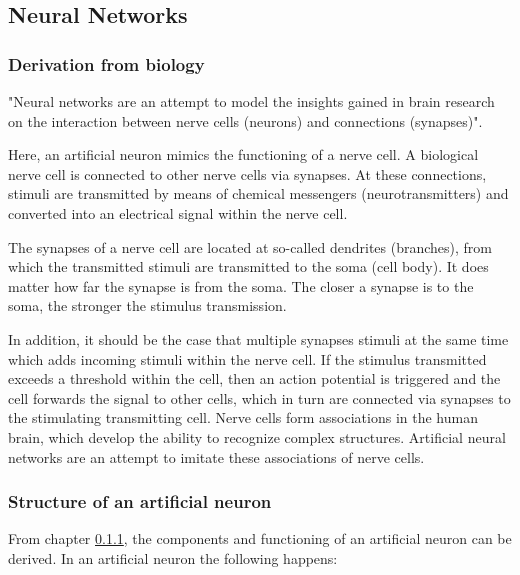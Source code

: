 \subsection{Neural Networks}

\subsubsection{Derivation from biology}
\label{ss_nn_derivation_from_biology}

"Neural networks are an attempt to model the insights
gained in brain research on the interaction between nerve
cells (neurons) and connections (synapses)".\cite{ct_math}

Here, an artificial neuron mimics the functioning of a nerve cell. A
biological nerve cell is connected to other nerve cells via
synapses. At these connections, stimuli are transmitted by
means of chemical messengers (neurotransmitters) and
converted into an electrical signal within the nerve cell.

The synapses of a nerve cell are located at so-called
dendrites (branches), from which the transmitted stimuli
are transmitted to the soma (cell body). It does matter how
far the synapse is from the soma. The closer a synapse is
to the soma, the stronger the stimulus transmission.\cite{%
bio,ct_math}

In addition, it should be the case that multiple synapses
stimuli at the same time which adds incoming stimuli within
the nerve cell.\cite{bio} If the stimulus transmitted
exceeds a threshold within the cell, then an action
potential is triggered and the cell forwards the signal to
other cells, which in turn are connected via synapses to
the stimulating transmitting cell. Nerve cells form
associations in the human brain, which develop the ability
to recognize complex structures. Artificial neural networks
are an attempt to imitate these associations of nerve
cells.\cite{ct_math}

\subsubsection{Structure of an artificial neuron}



From chapter \ref{ss_nn_derivation_from_biology}, the
components and functioning of an artificial neuron can be
derived.
\newline\newline
In an artificial neuron the following happens:

